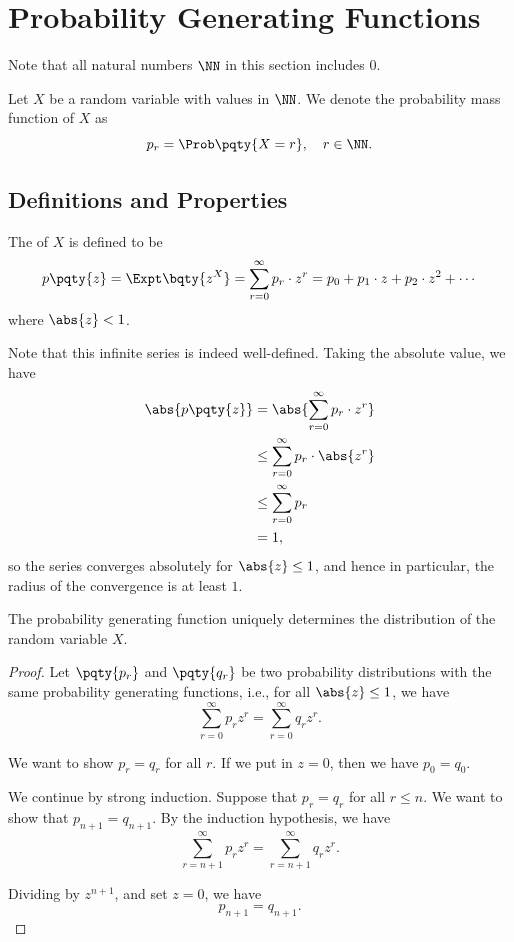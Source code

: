 \section{Probability Generating Functions}

Note that all natural numbers \(\NN\) in this section includes \(0\).

Let \(X\) be a random variable with values in \(\NN\). We denote the probability mass function of \(X\) as
\[
    p_r = \Prob\pqty{X = r}, \quad r \in \NN.
\]

\subsection{Definitions and Properties}

\begin{definition}
    \label{def:probability-generating-function}%
    The  of \(X\) is defined to be
    \[
        p \pqty{z} = \Expt\bqty{z^X} = \sum_{r = 0}^{\infty} p_r \cdot z^r = p_0 + p_1 \cdot z + p_2 \cdot z^2 + \cdots
    \]
    where \(\abs{z} < 1\).
\end{definition}

Note that this infinite series is indeed well-defined. Taking the absolute value, we have
\begin{align*}
    \abs{p\pqty{z}} &= \abs{\sum_{r = 0}^{\infty} p_r \cdot z^r} \\
    &\leq \sum_{r = 0}^{\infty} p_r \cdot \abs{z^r} \\
    &\leq \sum_{r = 0}^{\infty} p_r \\
    &= 1,
\end{align*}
so the series converges absolutely for \(\abs{z} \leq 1\), and hence in particular, the radius of the convergence is at least \(1\).

\begin{theorem}
    \label{thm:pgf-uniqueness}%
    The probability generating function uniquely determines the distribution of the random variable \(X\).
\end{theorem}

\begin{proof}
    Let \(\pqty{p_r}\) and \(\pqty{q_r}\) be two probability distributions with the same probability generating functions, i.e., for all \(\abs{z} \leq 1\), we have
    \[
        \sum_{r = 0}^{\infty} p_r z^r = \sum_{r = 0}^{\infty} q_r z^r.
    \]

    We want to show \(p_r = q_r\) for all \(r\). If we put in \(z = 0\), then we have \(p_0 = q_0\).

    We continue by strong induction. Suppose that \(p_r = q_r\) for all \(r \leq n\). We want to show that \(p_{n + 1} = q_{n + 1}\). By the induction hypothesis, we have
    \[
        \sum_{r = n + 1}^{\infty} p_r z^r = \sum_{r = n + 1}^{\infty} q_r z^r.
    \]

    Dividing by \(z^{n + 1}\), and set \(z = 0\), we have
    \[
        p_{n + 1} = q_{n + 1}.
    \]
\end{proof}

